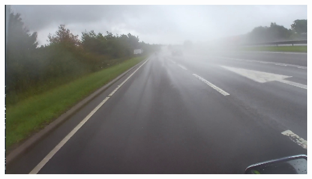 \documentclass[a0,portrait]{a0poster}
\begin{document}
\begin{multicols}{2}
\begin{center}
\begin{minipage}{0.15\textwidth}
					\label{fig:detectionOfMotorcycleW2}
				\end{minipage}\hfill
				\begin{minipage}{0.15\textwidth}
					\centering
					\includegraphics[width=\linewidth]{wet_danger.png}
					\label{fig:detectionOfMotorcycleW3}
				\end{minipage}\vspace{1cm}
			\end{center}\vspace{1cm}
		

\end{multicols}
\end{document}
